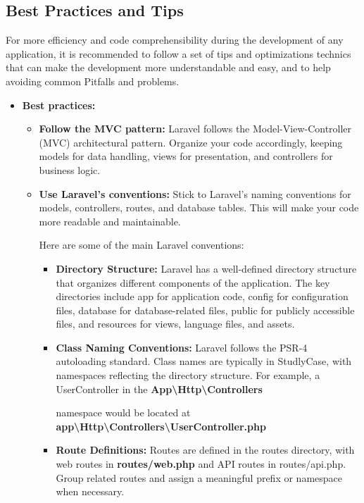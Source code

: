 \subsection{Best Practices and Tips}
For more efficiency and code comprehensibility during the development of any application, it is recommended to follow a set of tips and optimizations technics that can make the development more understandable and easy, and to help avoiding common Pitfalls and problems. 
\begin{itemize}
    \item \textbf{Best practices:} 
    \begin{itemize}
    
     \item \textbf{Follow the MVC pattern: } Laravel follows the Model-View-Controller (MVC) architectural pattern. Organize your code accordingly, keeping models for data handling, views for presentation, and controllers for business logic.
    
     \item \textbf{Use Laravel's conventions: } Stick to Laravel's naming conventions for models, controllers, routes, and database tables. This will make your code more readable and maintainable.
    
\medskip Here are some of the main Laravel conventions:
\begin{itemize}
\item \textbf{Directory Structure:} Laravel has a well-defined directory structure that organizes different components of the application. The key directories include app for application code, config for configuration files, database for database-related files, public for publicly accessible files, and resources for views, language files, and assets.

\item \textbf{Class Naming Conventions:} Laravel follows the PSR-4 autoloading standard. Class names are typically in StudlyCase, with namespaces reflecting the directory structure. For example, a UserController in the \textbf{App\textbackslash Http\textbackslash Controllers}
    
namespace would be located at \textbf{app\textbackslash Http\textbackslash Controllers\textbackslash UserController.php}

\item \textbf{Route Definitions:} Routes are defined in the routes directory, with web routes in \textbf{routes/web.php} and API routes in routes/api.php. Group related routes and assign a meaningful prefix or namespace when necessary.


\end{itemize}
\end{itemize}
\end{itemize}
